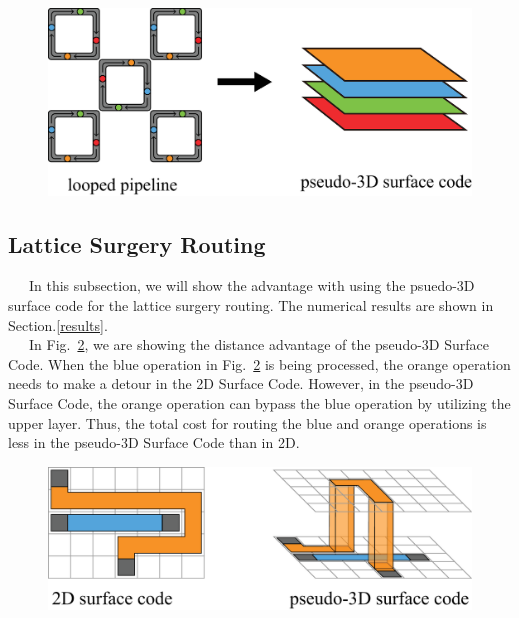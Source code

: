 \documentclass[a4paper,11pt]{ltjsarticle}
\begin{document}
{{        \begin{figure}[h]
            \centering
            \includegraphics[scale=0.30]{figure/pipeline_to_surface.eps}
            \vspace{0pt}\caption{}
            \label{pipeline_to_surface}
            \vspace{-10pt}
        \end{figure}
        
    }

    \subsection{Lattice Surgery Routing}{
        \ \ \ In this subsection, we will show the advantage with using the psuedo-3D surface code for the lattice surgery routing. The numerical results are shown in Section.\ref{results}.\\
        \ \ \ In Fig.~\ref{3D_advantage_distance}, we are showing the distance advantage of the pseudo-3D Surface Code. When the blue operation in Fig.~\ref{3D_advantage_distance} is being processed, the orange operation needs to make a detour in the 2D Surface Code. However, in the pseudo-3D Surface Code, the orange operation can bypass the blue operation by utilizing the upper layer. Thus, the total cost for routing the blue and orange operations is less in the pseudo-3D Surface Code than in 2D.

        \begin{figure}[h]
            \centering
            \includegraphics[scale=0.30]{figure/3D_advantage_distance.eps}
            \vspace{10pt}\caption{}
            \label{3D_advantage_distance}
            \vspace{-10pt}
        \end{figure}

}}
\end{document}
